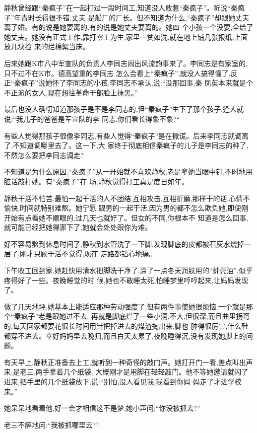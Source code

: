﻿\documentclass[12pt]{article}
\begin{document}
静秋曾经跟``秦疯子''在一起打过一段时间工,知道没人敢惹``秦疯子''。听说``秦疯子''年青时长得很不错,丈夫
是船厂的厂长。但不知道为什么,``秦疯子''却跟她丈夫离了婚。有的说是她要离的,有的说是她丈夫要离的。她四
个小孩一个没要,全给了她丈夫。她没有正式工作,靠打零工为生,家里一贫如洗,就在地上铺几张报纸,上面放几块捡
来的烂棉絮当床。

后来她跟K市八中军宣队的负责人李同志闹出风流韵事来了。李同志是有家室的,只不过不在K市。德高望重的李同志
怎么会看上``秦疯子'',就没人搞得懂了,反正``秦疯子''说她怀了李同志的小孩,李同志不承认,说:``没那回事,秦
凤英本来就是个不正派的女人,现在想往革命干部脸上抹黑。''

最后也没人确切知道那孩子是不是李同志的,但``秦疯子''生下了那个孩子,逢人就说:``我儿子的爸爸是军宣队的李
同志,你们看长得象不象?``

有些人觉得那孩子很像李同志,有些人觉得``秦疯子''是在撒谎。后来李同志就调离了,不知道调哪里去了。这一下,大
家终于彻底相信秦疯子的儿子是李同志的种了,不然怎么要把李同志调走?

不知道是为什么原因,``秦疯子''从一开始就不喜欢静秋,老是拿她当眼中钉,不时地用脏话敲打她。有``秦疯子''在
场,静秋觉得打工真是度日如年。

静秋干活不怕苦,最怕一起干活的人不团结,互相攻击,互相折磨,那样干的话,心情不愉快,时间就特别难熬。她宁愿
跟男的一起干活,因为男的都不怎么欺负她,即使刚开始有点看她不顺眼的,过几天也就好了。但女的不同,你根本不
知道是怎么回事,就可能已经把她得罪下了,她就会处处跟你为难。

好不容易熬到休息时间了,静秋到水管洗了一下脚,发现脚底的皮都被石灰水烧掉一层了,刚才只顾干活不觉得,现在
走路都钻心地痛。

下午收工回到家,她赶快用清水把脚洗干净了,涂了一点冬天润肤用的``蚌壳油'',似乎疼得好了一些。夜晚睡觉的时
候,她也不敢睡太死,怕睡梦里哼哼起来,让妈妈发现了。

做了几天地坪,她基本上能适应那种劳动强度了,但有两件事使她很烦恼,一个就是那个``秦疯子''老是跟她过不去,
再就是脚底烂了一些小洞,不大,但很深,而且曲里拐弯的,每天回家都要花很长时间用针把掉进去的煤渣掏出来,脚也
肿得很厉害,什么鞋都穿不进去。幸好妈妈早去晚归,而且白天太累了,夜晚睡得沉,没有发现她脚上的问题。

有天早上,静秋正准备去上工,就听到一种奇怪的敲门声。她打开门一看,差点叫出声来,是老三,两手拿着几个纸袋,
大概刚才是用脚在轻轻敲门。他不等她邀请就闪了进来,把手里的几个纸袋放下,说:``别怕,没人看见我,我看到你妈
妈走了才进学校来。''

她呆呆地看着他,好一会才相信这不是梦,她小声问:``你\myrule 没被抓去?''

老三不解地问:``我被抓哪里去?''
\end{document}
